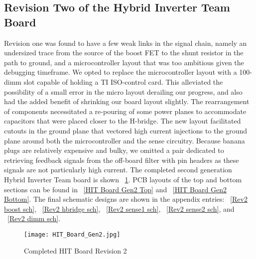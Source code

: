 \subsection{Revision Two of the Hybrid Inverter Team Board}
Revision one was found to have a few weak links in the signal chain, namely an undersized trace from the source of the boost FET to the shunt resistor in the path to ground, and a microcontroller layout that was too ambitious given the debugging timeframe. We opted to replace the microcontroller layout with a 100-dimm slot capable of holding a TI ISO-control card. This alleviated the possibility of a small error in the micro layout derailing our progress, and also had the added benefit of shrinking our board layout slightly. The rearrangement of components necessitated a re-pouring of some power planes to accommodate capacitors that were placed closer to the H-bridge. The new layout facilitated cutouts in the ground plane that vectored high current injections to the ground plane around both the microcontroller and the sense circuitry. Because banana plugs are relatively expensive and bulky, we omitted a pair dedicated to retrieving feedback signals from the off-board filter with pin headers as these signals are not particularly high current. The completed second generation Hybrid Inverter Team board is shown ~\ref{HIT Board Gen2}. PCB layouts of the top and bottom sections can be found in ~\ref{HIT Board Gen2 Top} and ~\ref{HIT Board Gen2 Bottom}. The final schematic designs are shown in the appendix entries: ~\ref{Rev2 boost sch}, ~\ref{Rev2 hbridge sch}, ~\ref{Rev2 sense1 sch}, ~\ref{Rev2 sense2 sch}, and ~\ref{Rev2 dimm sch}.

\begin{figure}
\centering
\texttt{[image: HIT\_Board\_Gen2.jpg]}
\caption{Completed HIT Board Revision 2}
\label{HIT Board Gen2}
\end{figure}
